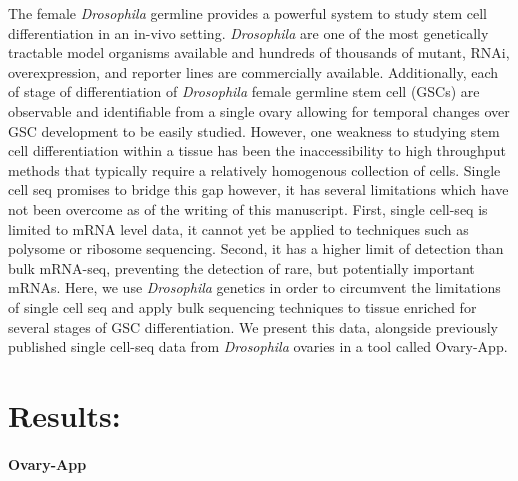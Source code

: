\documentclass[]{elsarticle} %
\begin{document}
The female \emph{Drosophila} germline provides a powerful system to
study stem cell differentiation in an in-vivo setting. \emph{Drosophila}
are one of the most genetically tractable model organisms available and
hundreds of thousands of mutant, RNAi, overexpression, and reporter
lines are commercially available. Additionally, each of stage of
differentiation of \emph{Drosophila} female germline stem cell (GSCs)
are observable and identifiable from a single ovary allowing for
temporal changes over GSC development to be easily studied. However, one
weakness to studying stem cell differentiation within a tissue has been
the inaccessibility to high throughput methods that typically require a
relatively homogenous collection of cells. Single cell seq promises to
bridge this gap however, it has several limitations which have not been
overcome as of the writing of this manuscript. First, single cell-seq is
limited to mRNA level data, it cannot yet be applied to techniques such
as polysome or ribosome sequencing. Second, it has a higher limit of
detection than bulk mRNA-seq, preventing the detection of rare, but
potentially important mRNAs. Here, we use \emph{Drosophila} genetics in
order to circumvent the limitations of single cell seq and apply bulk
sequencing techniques to tissue enriched for several stages of GSC
differentiation. We present this data, alongside previously published
single cell-seq data from \emph{Drosophila} ovaries in a tool called
Ovary-App.

\hypertarget{results}{%
\section{Results:}\label{results}}

\hypertarget{ovary-app}{%
\paragraph{Ovary-App}\label{ovary-app}}

\hfill\break
\end{document}
